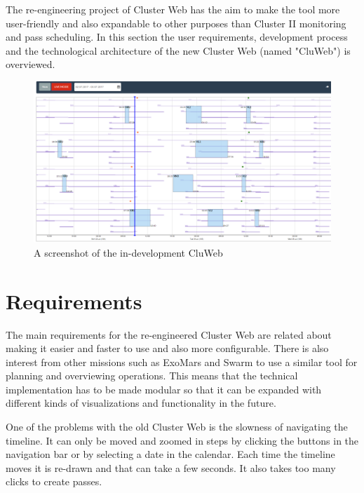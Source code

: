 
The re-engineering project of Cluster Web has the aim to make the tool more user-friendly and also expandable to other purposes than Cluster II monitoring and pass scheduling. In this section the user requirements, development process and the technological architecture of the new Cluster Web (named "CluWeb") is overviewed.

\begin{figure}[ht]
  \begin{center}
    \includegraphics*[width=1\textwidth]{cluweb_dev}
  \end{center}
  \caption{A screenshot of the in-development CluWeb}
  \label{fig:cluweb}
\end{figure}

\section{Requirements}
    The main requirements for the re-engineered Cluster Web are related about making it easier and faster to use and also more configurable. There is also interest from other missions such as ExoMars and Swarm to use a similar tool for planning and overviewing operations. This means that the technical implementation has to be made modular so that it can be expanded with different kinds of visualizations and functionality in the future.

One of the problems with the old Cluster Web is the slowness of navigating the timeline. It can only be moved and zoomed in steps by clicking the buttons in the navigation bar or by selecting a date in the calendar. Each time the timeline moves it is re-drawn and that can take a few seconds. It also takes too many clicks to create passes.


